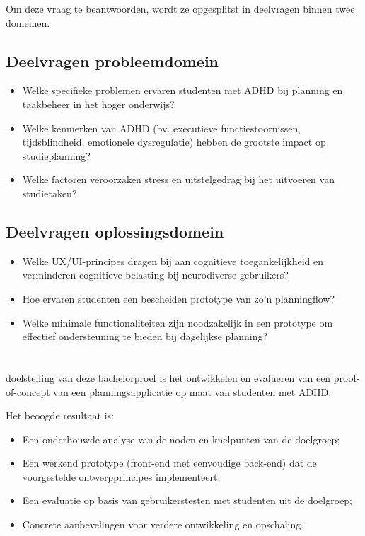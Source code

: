 Om deze vraag te beantwoorden, wordt ze opgesplitst in deelvragen binnen twee domeinen.
\subsection*{Deelvragen probleemdomein}
\begin{itemize}
  \item Welke specifieke problemen ervaren studenten met ADHD bij planning en taakbeheer in het hoger onderwijs?
  \item Welke kenmerken van ADHD (bv. executieve functiestoornissen, tijdsblindheid, emotionele dysregulatie) hebben de grootste impact op studieplanning?
  \item Welke factoren veroorzaken stress en uitstelgedrag bij het uitvoeren van studietaken?
\end{itemize}

\subsection*{Deelvragen oplossingsdomein}
\begin{itemize}
  \item Welke UX/UI-principes dragen bij aan cognitieve toegankelijkheid en verminderen cognitieve belasting bij neurodiverse gebruikers?
  \item Hoe ervaren studenten een bescheiden prototype  van zo'n planningflow?
  \item Welke minimale functionaliteiten zijn noodzakelijk in een prototype om effectief ondersteuning te bieden bij dagelijkse planning?
\end{itemize}
\section{}%
\label{sec:onderzoeksdoelstelling}

 doelstelling van deze bachelorproef is het ontwikkelen en evalueren van een proof-of-concept van een planningsapplicatie op maat van studenten met ADHD.

Het beoogde resultaat is:
\begin{itemize}
  \item Een onderbouwde analyse van de noden en knelpunten van de doelgroep;
  \item Een werkend prototype (front-end met eenvoudige back-end) dat de voorgestelde ontwerpprincipes implementeert;
  \item Een evaluatie op basis van gebruikerstesten met studenten uit de doelgroep;
  \item Concrete aanbevelingen voor verdere ontwikkeling en opschaling.
\end{itemize}

